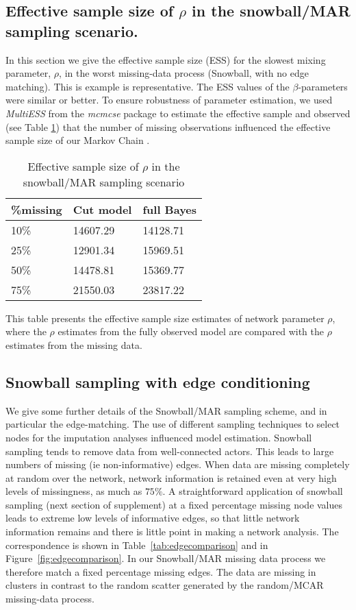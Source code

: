 \documentclass{article}
\begin{document}
\newpage
\subsection{Effective sample size of $\rho$ in the snowball/MAR sampling scenario.}\label{sec:ESS}

In this section we give the effective sample size (ESS) for the slowest mixing parameter, $\rho$, in the worst missing-data process (Snowball, with no edge matching). 
This is example is representative. The ESS values of the $\beta$-parameters were similar or better. To ensure robustness of parameter estimation, we used \textit{MultiESS} from the \textit{mcmcse} package to estimate the effective sample and observed (see Table \ref{tab:ESS}) that the number of missing observations influenced the effective sample size of our Markov Chain \cite{vats2015multivariate}.

\begin{table}[ht]
	\centering
	\caption{Effective sample size of $\rho$ in the snowball/MAR sampling scenario}
	\label{tab:ESS}
	\begin{tabular}{lll}
		\%missing	& Cut model	& full Bayes\\ \hline
		10\% 		& 14607.29  & 14128.71  \\
		25\%		& 12901.34 	& 15969.51  \\
		50\%		& 14478.81  & 15369.77 	\\
		75\% 		& 21550.03  & 23817.22 \\ \hline
	\end{tabular}
	
	\raggedright This table presents the effective sample size estimates of network parameter $\rho$, {\color{blue}where the $\rho$ estimates from the fully observed model are compared with the $\rho$ estimates from the missing data.}
\end{table}

\subsection{Snowball sampling with edge conditioning}\label{sec:supsnowballnotes}

We give some further details of the Snowball/MAR sampling scheme, and in particular the edge-matching. The use of different sampling techniques to select nodes for the imputation analyses influenced model estimation. Snowball sampling tends to remove data from well-connected actors. This leads to large numbers of missing (ie non-informative) edges. When data are missing completely at random over the network, network information is retained even at very high levels of missingness, as much as $75\%$. A straightforward application of snowball sampling (next section of supplement) at a fixed percentage missing node values leads to extreme low levels of informative edges, so that little network information remains and there is
little point in making a network analysis. The correspondence is shown in Table~\ref{tab:edgecomparison} and in Figure~\ref{fig:edgecomparison}. In our Snowball/MAR missing data process we therefore match a fixed percentage missing edges. The data are missing in clusters in contrast to the random scatter generated by the random/MCAR missing-data process.
\end{document}
